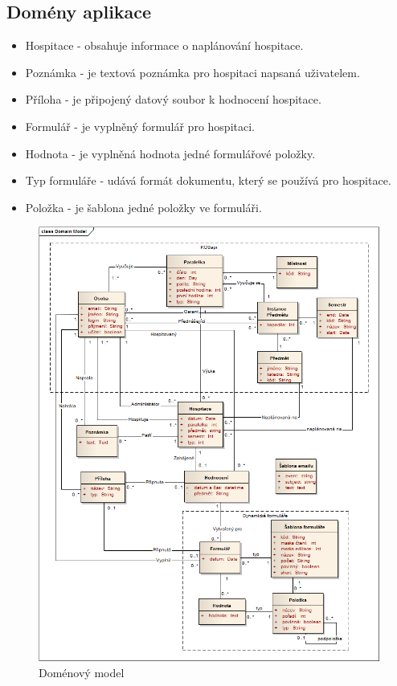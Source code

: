\subsection{Domény aplikace}
\begin{itemize}
\item Hospitace - obsahuje informace o naplánování hospitace. 
\item Poznámka - je textová poznámka pro hospitaci napsaná uživatelem.
\item Příloha - je připojený datový soubor k hodnocení hospitace.
\item Formulář - je vyplněný formulář pro hospitaci.
\item Hodnota - je vyplněná hodnota jedné formulářové položky.
\item Typ formuláře - udává formát dokumentu, který se používá pro hospitace. 
\item Položka - je šablona jedné položky ve formuláři.
\end{itemize}

\begin{figure}[p]
\begin{center}
\includegraphics[width=14cm]{figures/DomainModel2}
\caption{Doménový model}
\label{fig:domainmodel}
\end{center}
\end{figure}



